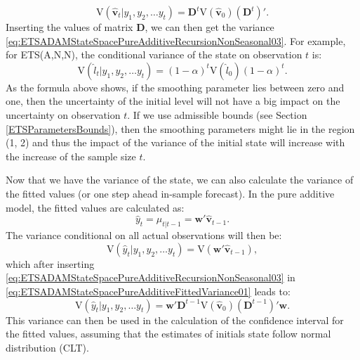 \documentclass[
]{book}
\theoremstyle{definition}
\theoremstyle{definition}
\theoremstyle{definition}
\theoremstyle{definition}
\theoremstyle{remark}
\begin{document}
\begin{equation}
    \mathrm{V}(\hat{\mathbf{v}}_{t} | y_1, y_2, \dots y_t) = \mathbf{D}^{t} \mathrm{V}\left( \hat{\mathbf{v}}_{0} \right) \left(\mathbf{D}^{t}\right)' .
  \label{eq:ETSADAMStateSpacePureAdditiveRecursionNonSeasonal03}
\end{equation}
Inserting the values of matrix \(\mathbf{D}\), we can then get the variance \eqref{eq:ETSADAMStateSpacePureAdditiveRecursionNonSeasonal03}. For example, for ETS(A,N,N), the conditional variance of the state on observation \(t\) is:
\begin{equation}
    \mathrm{V}(\hat{l}_{t} | y_1, y_2, \dots y_t) = (1-\alpha)^{t} \mathrm{V}\left( \hat{l}_{0} \right) (1-\alpha)^{t} .
  \label{eq:ETSADAMStateSpacePureAdditiveRecursionANN}
\end{equation}
As the formula above shows, if the smoothing parameter lies between zero and one, then the uncertainty of the initial level will not have a big impact on the uncertainty on observation \(t\). If we use admissible bounds (see Section \ref{ETSParametersBounds}), then the smoothing parameters might lie in the region (1, 2) and thus the impact of the variance of the initial state will increase with the increase of the sample size \(t\).

Now that we have the variance of the state, we can also calculate the variance of the fitted values (or one step ahead in-sample forecast). In the pure additive model, the fitted values are calculated as:
\begin{equation}
    \hat{y}_t = \mu_{t|t-1} = \mathbf{w}' \hat{\mathbf{v}}_{t-1}.
  \label{eq:ETSADAMStateSpacePureAdditiveFitted}
\end{equation}
The variance conditional on all actual observations will then be:
\begin{equation}
    \mathrm{V}(\hat{y}_t | y_1, y_2, \dots y_t) = \mathrm{V}\left( \mathbf{w}' \hat{\mathbf{v}}_{t-1} \right) ,
  \label{eq:ETSADAMStateSpacePureAdditiveFittedVariance01}
\end{equation}
which after inserting \eqref{eq:ETSADAMStateSpacePureAdditiveRecursionNonSeasonal03} in \eqref{eq:ETSADAMStateSpacePureAdditiveFittedVariance01} leads to:
\begin{equation}
    \mathrm{V}(\hat{y}_t | y_1, y_2, \dots y_t) = \mathbf{w}' \mathbf{D}^{t-1} \mathrm{V}\left( \hat{\mathbf{v}}_{0} \right) \left(\mathbf{D}^{t-1}\right)' \mathbf{w} .
  \label{eq:ETSADAMStateSpacePureAdditiveFittedVariance02}
\end{equation}
This variance can then be used in the calculation of the confidence interval for the fitted values, assuming that the estimates of initials state follow normal distribution (CLT).
\end{document}
